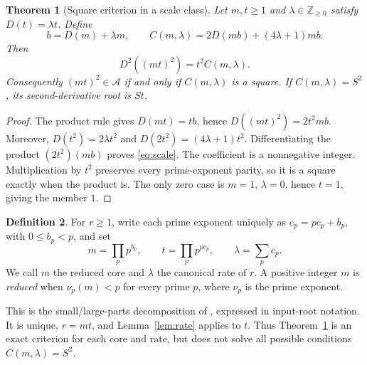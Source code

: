 \documentclass[11pt]{article}
\newtheorem{theorem}{Theorem}[section]
\theoremstyle{definition}
\newtheorem{definition}[theorem]{Definition}
\theoremstyle{remark}
\newcommand{\NN}{\mathbb Z_{\geq0}}
\newcommand{\DD}{D^{2}}
\begin{document}
\begin{theorem}[Square criterion in a scale class]\label{thm:scale}
Let $m,t\geq1$ and $\lambda\in\NN$ satisfy $D(t)=\lambda t$. Define
\begin{equation}\label{eq:coefficient}
 b=D(m)+\lambda m,\qquad
 C(m,\lambda)=2D(mb)+(4\lambda+1)mb.
\end{equation}
Then
\begin{equation}\label{eq:scale}
 \DD((mt)^{2})=t^{2}C(m,\lambda).
\end{equation}
Consequently $(mt)^{2}\in\mathcal A$ if and only if $C(m,\lambda)$
is a square. If $C(m,\lambda)=S^{2}$, its second-derivative root is $St$.
\end{theorem}
\begin{proof}
The product rule gives $D(mt)=tb$, hence $D((mt)^{2})=2t^{2}mb$.
Moreover, $D(t^{2})=2\lambda t^{2}$ and
$D(2t^{2})=(4\lambda+1)t^{2}$. Differentiating the product
$(2t^{2})(mb)$ proves \eqref{eq:scale}. The coefficient is a nonnegative
integer. Multiplication by $t^{2}$ preserves every prime-exponent parity,
so it is a square exactly when the product is. The only zero case is
$m=1$, $\lambda=0$, hence $t=1$, giving the member $1$.
\end{proof}

\begin{definition}\label{def:core}
For $r\geq1$, write each prime exponent uniquely as
$e_p=pc_p+b_p$, with $0\leq b_p<p$, and set
\begin{equation}\label{eq:canonical}
 m=\prod_p p^{b_p},\qquad t=\prod_p p^{pc_p},\qquad
 \lambda=\sum_p c_p.
\end{equation}
We call $m$ the reduced core and $\lambda$ the canonical rate of $r$.
A positive integer $m$ is \emph{reduced} when $\nu_p(m)<p$ for every
prime $p$, where $\nu_p$ is the prime exponent.
\end{definition}

This is the small/large-parts decomposition of \cite[Section 8]{ufn},
expressed in input-root
notation. It is unique, $r=mt$, and Lemma~\ref{lem:rate} applies to $t$.
Thus Theorem~\ref{thm:scale} is an exact criterion for each core and rate,
but does not solve all possible conditions $C(m,\lambda)=S^{2}$.
\end{document}
